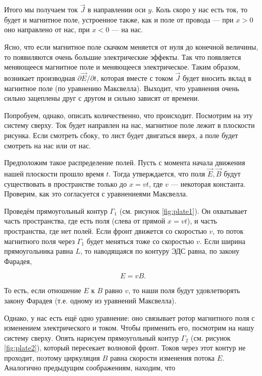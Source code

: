\documentclass[a4paper,12pt]{article}
\numberwithin{equation}{section}
\newcommand{\pt}{\partial}
\begin{document}
Итого мы получаем ток $\vec{J}$ в направлении оси $y$. Коль скоро у
нас есть ток, то будет и магнитное поле, устроенное также, как и поле
от провода --- при $x>0$ оно направлено от нас, при $x<0$ --- на нас. 

Ясно, что если магнитное поле скачком меняется от нуля до конечной
величины, то появиляются очень большие электрические эффекты. Так что
появляется меняющееся магнитное поле и меняющееся электрическое. Таким
образом, возникает производная $\pt \vec{E} / \pt t$, которая вместе с
током $\vec{J}$ будет вносить вклад в магнитное поле (по уравнению
Максвелла). Выходит, что уравнения очень сильно зацеплены друг с
другом и сильно зависят от времени. 

Попробуем, однако, описать количественно, что происходит. Посмотрим на
эту систему сверху. Ток будет направлен на нас, магнитное поле лежит
в плоскости рисунка. Если смотреть сбоку, то лист будет двигаться
вверх, а поле будет смотреть на нас или от нас. 

Предположим такое распределение полей. Пусть с момента начала движения
нашей плоскости прошло время $t$. Тогда утверждается, что поля
$\vec{E}, \vec{B}$ будут существовать в пространстве только до
$x=vt$, где $v$ --- некоторая константа. Проверим, как это согласуется с
уравнениеями Максвелла. 

Проведём прямоугольный контур $\Gamma_1$ (см. рисунок \ref{fig:plate1}). Он
охватывает часть пространства, где есть поля (слева от прямой $x=vt$),
и часть пространства, где нет полей. Если фронт движется со скоростью
$v$, то поток магнитного поля через $\Gamma_1$ будет меняться тоже со
скоростью $v$. Если ширина прямоугольника равна $L$, то наводящаяся по
контуру ЭДС равна, по закону Фарадея,

\begin{equation}
  \label{eq:moving_plate_1}
  E = v B.
\end{equation}

То есть, если отношение $E$ к $B$ равно $v$, то наши поля будут
удовлетворять закону Фарадея (т.е. одному из уравнений Максвелла). 

Однако, у нас есть ещё одно уравнение: оно связывает ротор магнитного
поля с изменением электрического и током. Чтобы применить его,
посмотрим на нашу систему сверху. Опять нарисуем прямоугольный контур
$\Gamma_2$ (см. рисунок \ref{fig:plate2}), который пересекает волновой
фронт. Токов через этот контур не проходит, поэтому циркуляция $B$
равна скорости изменения потока $E$. Аналогично предыдущим
соображениям, находим, что
\end{document}
